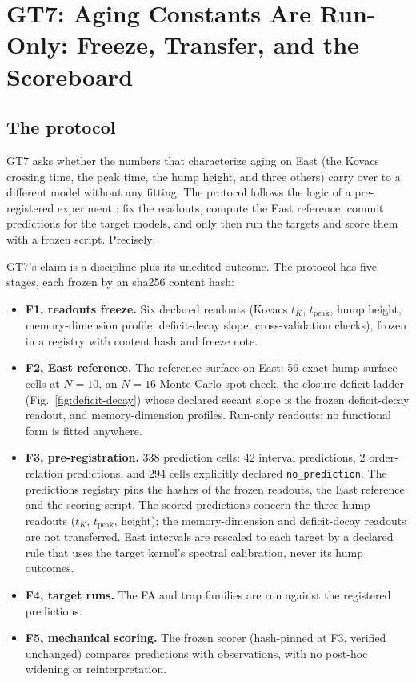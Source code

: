 \section{GT7: Aging Constants Are Run-Only: Freeze, Transfer, and the Scoreboard}
\label{sec:gt7}

\subsection{The protocol}

GT7 asks whether the numbers that characterize aging on East (the Kovacs crossing time, the peak
time, the hump height, and three others) carry over to a different model without any fitting. The
protocol follows the logic of a pre-registered experiment \cite{nosek-et-al-2018,munafo-et-al-2017}:
fix the readouts, compute the East reference, commit predictions for the target models, and only
then run the targets and score them with a frozen script. Precisely:

GT7's claim is a discipline plus its unedited outcome. The protocol has five stages, each frozen
by an sha256 content hash:

\begin{itemize}
  \item \textbf{F1, readouts freeze.} Six declared readouts (Kovacs $t_K$, $t_{\mathrm{peak}}$,
    hump height, memory-dimension profile, deficit-decay slope, cross-validation checks), frozen in
    a registry with content hash and freeze note.
  \item \textbf{F2, East reference.} The reference surface on East: 56 exact hump-surface cells
    at $N=10$, an $N=16$ Monte Carlo spot check, the closure-deficit ladder
    (Fig.~\ref{fig:deficit-decay}) whose declared secant slope is the frozen deficit-decay readout,
    and memory-dimension profiles. Run-only readouts; no functional form is fitted anywhere.
  \item \textbf{F3, pre-registration.} 338 prediction cells: 42 interval predictions, 2
    order-relation predictions, and 294 cells explicitly declared \texttt{no\_prediction}. The
    predictions registry pins the hashes of the frozen readouts, the East reference and the
    scoring script. The scored predictions concern the three hump readouts ($t_K$,
    $t_{\mathrm{peak}}$, height); the memory-dimension and deficit-decay readouts are not
    transferred. East intervals are rescaled to each target by a declared rule that uses the
    target kernel's spectral calibration, never its hump outcomes.
  \item \textbf{F4, target runs.} The FA and trap families are run against the registered
    predictions.
  \item \textbf{F5, mechanical scoring.} The frozen scorer (hash-pinned at F3, verified unchanged)
    compares predictions with observations, with no post-hoc widening or reinterpretation.
\end{itemize}

